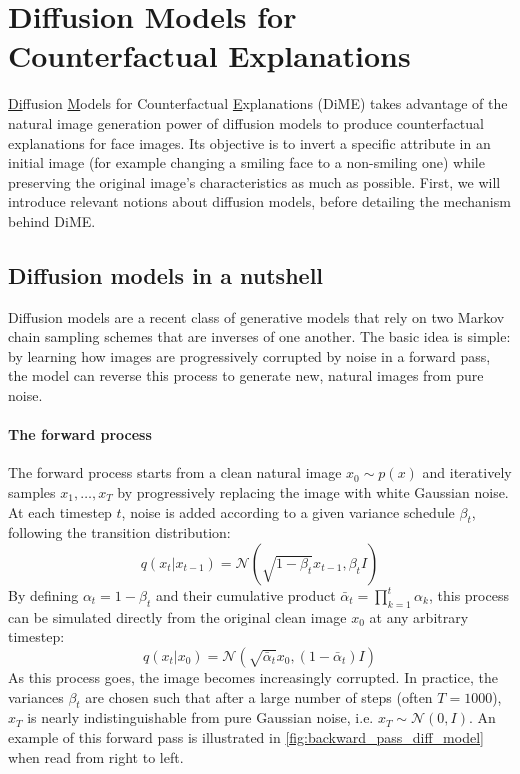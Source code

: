 \documentclass[11pt]{article}
\begin{document}
\section{Diffusion Models for Counterfactual Explanations}

\underline{Di}ffusion \underline{M}odels for Counterfactual
\underline{E}xplanations (DiME) \cite{jeanneret2022diffusion} takes
advantage of the natural image generation power of diffusion models
to produce counterfactual explanations for face images. Its objective
is to invert a specific attribute in an initial image (for example
changing a smiling face to a non-smiling one) while preserving the
original image's characteristics as much as possible. First, we will
introduce relevant notions about diffusion models, before detailing
the mechanism behind DiME.

\subsection{Diffusion models in a nutshell}

Diffusion models are a recent class of generative models that rely on
two Markov chain sampling schemes that are inverses of one another.
The basic idea is simple: by learning how images are progressively
corrupted by noise in a forward pass, the model can reverse this
process to generate new, natural images from pure noise.

\paragraph{The forward process}

The forward process starts from a clean natural image $x_0 \sim p(x)$
and iteratively samples $x_1, \dots, x_T$ by progressively replacing
the image with white Gaussian noise. At each timestep $t$, noise is
added according to a given variance schedule $\beta_t$, following the
transition distribution:
$$
q(x_t|x_{t-1}) = \mathcal{N}(\sqrt{1 - \beta_t}x_{t-1}, \beta_t I)
$$
By defining $\alpha_t = 1 - \beta_t$ and their cumulative product
$\bar{\alpha}_t = \prod_{k=1}^t \alpha_k$, this process can be
simulated directly from the original clean image $x_0$ at any
arbitrary timestep:
$$
q(x_t|x_0) = \mathcal{N}(\sqrt{\bar{\alpha}_t}x_0, (1 - \bar{\alpha}_t)I)
$$
As this process goes, the image becomes increasingly corrupted. In
practice, the variances $\beta_t$ are chosen such that after a large
number of steps (often $T = 1000$), $x_T$ is nearly indistinguishable
from pure Gaussian noise, i.e. $x_T \sim \mathcal{N}(0, I)$. An
example of this forward pass is illustrated in
\autoref{fig:backward_pass_diff_model} when read from right to left.
\end{document}
